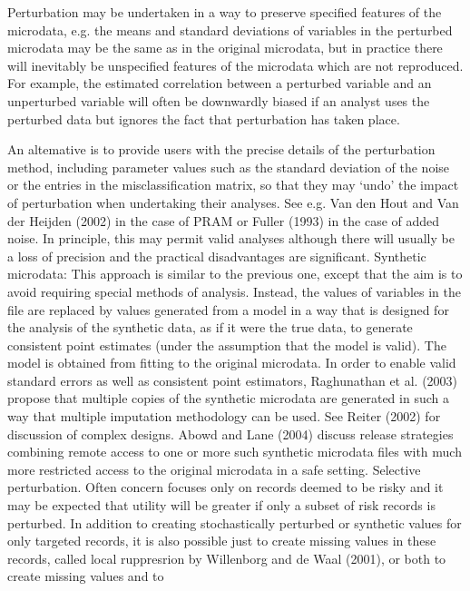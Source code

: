 Perturbation may be undertaken in a way to preserve specified features of the microdata, e.g. the means and standard deviations of variables in the perturbed microdata may be the same as in the original microdata, but in practice there
will inevitably be unspecified features of the microdata which are not reproduced. For example, the estimated correlation between a perturbed variable and an unperturbed variable will often be downwardly biased if an analyst uses the perturbed data but ignores
the fact that perturbation has taken place. 

An altemative is to provide users with the
precise details of the perturbation method, including parameter values such as the
standard deviation of the noise or the entries in the misclassification matrix, so that they
may ‘undo’ the impact of perturbation when undertaking their analyses. See e.g. Van den
Hout and Van der Heijden (2002) in the case of PRAM or Fuller (1993) in the case of
added noise. In principle, this may permit valid analyses although there will usually be a
loss of precision and the practical disadvantages are significant.
Synthetic microdata: This approach is similar to the previous one, except that the aim
is to avoid requiring special methods of analysis. Instead, the values of variables in the
file are replaced by values generated from a model in a way that is designed for the
analysis of the synthetic data, as if it were the true data, to generate consistent point
estimates (under the assumption that the model is valid). The model is obtained from
fitting to the original microdata. In order to enable valid standard errors as well as
consistent point estimators, Raghunathan et al. (2003) propose that multiple copies of the
synthetic microdata are generated in such a way that multiple imputation methodology
can be used. See Reiter (2002) for discussion of complex designs. Abowd and Lane
(2004) discuss release strategies combining remote access to one or more such synthetic
microdata files with much more restricted access to the original microdata in a safe
setting.
Selective perturbation. Often concern focuses only on records deemed to be risky and
it may be expected that utility will be greater if only a subset of risk records is perturbed.
In addition to creating stochastically perturbed or synthetic values for only targeted
records, it is also possible just to create missing values in these records, called local
ruppresrion by Willenborg and de Waal (2001), or both to create missing values and to
